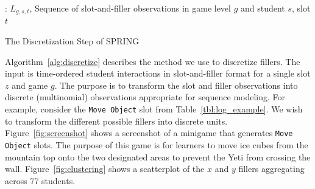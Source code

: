 \documentclass{sigchi}
\def\algname{SPRING\xspace}
\begin{document}
\begin{algorithm}[ht]
	\begin{algorithmic}[1]
		\Require: $L_{g,s,t}$, Sequence of slot-and-filler observations in game level $g$ and student $s$, slot $t$
		
	
		\State
					\EndIf
				\EndFor
		\EndFor
		\State {}
		\EndProcedure
		
	\end{algorithmic}
	\caption{The Discretization Step of \algname \label{alg:discretize}}
\end{algorithm}


Algorithm~\ref{alg:discretize} describes the method we use to discretize fillers.
The input is time-ordered student interactions in slot-and-filler format for a single slot $z$ and game $g$.
The purpose is to transform the slot and filler observations into  discrete (multinomial) observations appropriate for sequence modeling.
For example, consider the \texttt{Move Object} slot from Table~\ref{tbl:log_example}.
We wish to transform the different possible fillers into discrete units.
Figure~\ref{fig:screenshot} shows a screenshot of a minigame that generates  \texttt{Move Object} slots.
The purpose of this game is for learners to move ice cubes from the mountain top onto the two designated areas to prevent the Yeti from crossing the wall.
Figure~\ref{fig:clustering} shows a scatterplot of the $x$ and $y$ fillers aggregating across 77 students.
\end{document}
